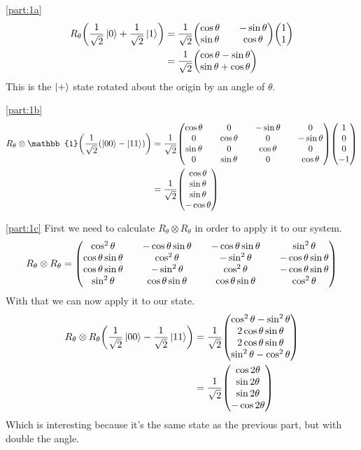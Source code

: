 \documentclass[boxes]{homework}
\begin{document}
\begin{solution}
	\ref{part:1a}
	\begin{align*}
		R_\theta\qty(\frac{1}{\sqrt{2}}\ket{0} + \frac{1}{\sqrt{2}}\ket{1}) &= \frac{1}{\sqrt{2}}\mqty(\cos{\theta} && -\sin{\theta} \\ \sin{\theta} && \cos{\theta})\mqty(1 \\ 1) \\
		&= \frac{1}{\sqrt{2}}\mqty(\cos\theta - \sin\theta \\ \sin\theta + \cos\theta)
	\end{align*}
	This is the $\ket{+}$ state rotated about the origin by an angle of $\theta$.

	\ref{part:1b}
	\begin{align*}
		R_\theta\otimes\mathbb{1} \qty(\frac{1}{\sqrt{2}}\qty(\ket{00} - \ket{11})) & = \frac{1}{\sqrt{2}}\mqty(\cos\theta && 0 && -\sin\theta && 0 \\ 0 && \cos\theta && 0 && -\sin\theta \\ \sin\theta && 0 && \cos\theta && 0 \\ 0 &&\sin\theta &&  0 && \cos\theta)\mqty(1 \\ 0 \\ 0 \\ -1) \\
		&= \frac{1}{\sqrt{2}}\mqty(\cos\theta \\ \sin\theta \\ \sin\theta \\ -\cos\theta)
	\end{align*}

	\ref{part:1c}
	First we need to calculate $R_\theta\otimes R_\theta$ in order to apply it to our system.
	\begin{equation*}
		R_\theta\otimes R_\theta = \mqty(\cos^2\theta && -\cos\theta\sin\theta && -\cos\theta\sin\theta && \sin^2\theta \\ \cos\theta\sin\theta && \cos^2\theta && -\sin^2\theta && -\cos\theta\sin\theta \\ \cos\theta\sin\theta && -\sin^2\theta && \cos^2\theta && -\cos\theta\sin\theta \\ \sin^2\theta && \cos\theta\sin\theta && \cos\theta\sin\theta && \cos^2\theta)
	\end{equation*}
	With that we can now apply it to our state.
	\begin{align*}
		R_\theta\otimes R_\theta\qty(\frac{1}{\sqrt{2}}\ket{00} - \frac{1}{\sqrt{2}}\ket{11}) & = \frac{1}{\sqrt{2}}\mqty(\cos^2\theta - \sin^2\theta \\ 2\cos\theta\sin\theta \\ 2\cos\theta\sin\theta \\ \sin^2\theta - \cos^2\theta) \\
		                                                                                      & = \frac{1}{\sqrt{2}}\mqty(\cos 2\theta                \\ \sin 2\theta \\ \sin 2\theta \\ -\cos 2\theta)
	\end{align*}
	Which is interesting because it's the same state as the previous part, but with double the angle.


\end{solution}
\end{document}

